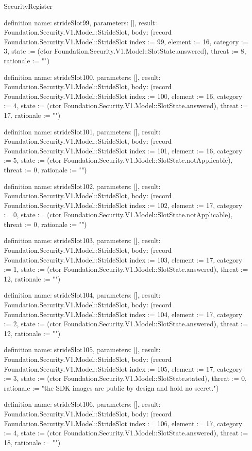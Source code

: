 \begin{lexlean}{SecurityRegister}
\begin{semanticmodule}
definition{
  name: strideSlot99,
  parameters: [],
  result: Foundation.Security.V1.Model::StrideSlot,
  body: (record Foundation.Security.V1.Model::StrideSlot {index := 99, element := 16, category := 3, state := (ctor Foundation.Security.V1.Model::SlotState.answered), threat := 8, rationale := ""})
}

definition{
  name: strideSlot100,
  parameters: [],
  result: Foundation.Security.V1.Model::StrideSlot,
  body: (record Foundation.Security.V1.Model::StrideSlot {index := 100, element := 16, category := 4, state := (ctor Foundation.Security.V1.Model::SlotState.answered), threat := 17, rationale := ""})
}

definition{
  name: strideSlot101,
  parameters: [],
  result: Foundation.Security.V1.Model::StrideSlot,
  body: (record Foundation.Security.V1.Model::StrideSlot {index := 101, element := 16, category := 5, state := (ctor Foundation.Security.V1.Model::SlotState.notApplicable), threat := 0, rationale := ""})
}

definition{
  name: strideSlot102,
  parameters: [],
  result: Foundation.Security.V1.Model::StrideSlot,
  body: (record Foundation.Security.V1.Model::StrideSlot {index := 102, element := 17, category := 0, state := (ctor Foundation.Security.V1.Model::SlotState.notApplicable), threat := 0, rationale := ""})
}

definition{
  name: strideSlot103,
  parameters: [],
  result: Foundation.Security.V1.Model::StrideSlot,
  body: (record Foundation.Security.V1.Model::StrideSlot {index := 103, element := 17, category := 1, state := (ctor Foundation.Security.V1.Model::SlotState.answered), threat := 12, rationale := ""})
}

definition{
  name: strideSlot104,
  parameters: [],
  result: Foundation.Security.V1.Model::StrideSlot,
  body: (record Foundation.Security.V1.Model::StrideSlot {index := 104, element := 17, category := 2, state := (ctor Foundation.Security.V1.Model::SlotState.answered), threat := 12, rationale := ""})
}

definition{
  name: strideSlot105,
  parameters: [],
  result: Foundation.Security.V1.Model::StrideSlot,
  body: (record Foundation.Security.V1.Model::StrideSlot {index := 105, element := 17, category := 3, state := (ctor Foundation.Security.V1.Model::SlotState.stated), threat := 0, rationale := "the SDK images are public by design and hold no secret."})
}

definition{
  name: strideSlot106,
  parameters: [],
  result: Foundation.Security.V1.Model::StrideSlot,
  body: (record Foundation.Security.V1.Model::StrideSlot {index := 106, element := 17, category := 4, state := (ctor Foundation.Security.V1.Model::SlotState.answered), threat := 18, rationale := ""})
}


\end{semanticmodule}
\end{lexlean}
